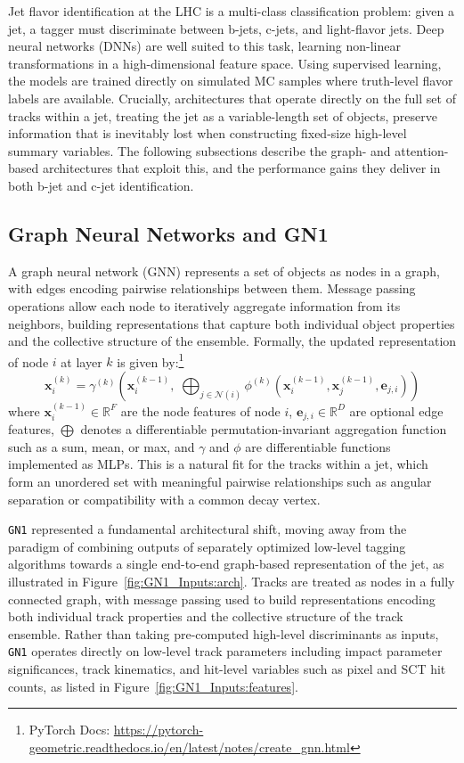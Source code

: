 Jet flavor identification at the LHC is a multi-class classification problem: given a jet, a tagger must discriminate between b-jets, c-jets, and light-flavor jets. 
Deep neural networks (DNNs) are well suited to this task, learning non-linear transformations in a high-dimensional feature space. 
Using supervised learning, the models are trained directly on simulated MC samples where truth-level flavor labels are available. 
Crucially, architectures that operate directly on the full set of tracks within a jet, treating the jet as a variable-length set of objects, preserve information that is inevitably lost when constructing fixed-size high-level summary variables. 
The following subsections describe the graph- and attention-based architectures that exploit this, and the performance gains they deliver in both b-jet and c-jet identification.

\subsection{Graph Neural Networks and GN1}

A graph neural network (GNN) represents a set of objects as nodes in a graph, with edges encoding pairwise relationships between them. 
Message passing operations allow each node to iteratively aggregate information from its neighbors, building representations that capture both individual object properties and the collective structure of the ensemble. 
Formally, the updated representation of node $i$ at layer $k$ is given by:\footnote{PyTorch Docs: \url{https://pytorch-geometric.readthedocs.io/en/latest/notes/create_gnn.html}}
\begin{equation}
	\mathbf{x}_i^{(k)} = \gamma^{(k)} \!\left( \mathbf{x}_i^{(k-1)},\; \bigoplus_{j \in \mathcal{N}(i)} \phi^{(k)}\!\left( \mathbf{x}_i^{(k-1)}, \mathbf{x}_j^{(k-1)}, \mathbf{e}_{j,i} \right) \right)
\end{equation}
where $\mathbf{x}_i^{(k-1)} \in \mathbb{R}^F$ are the node features of node $i$, $\mathbf{e}_{j,i} \in \mathbb{R}^D$ are optional edge features, $\bigoplus$ denotes a differentiable permutation-invariant aggregation function such as a sum, mean, or max, and $\gamma$ and $\phi$ are differentiable functions implemented as MLPs. 
This is a natural fit for the tracks within a jet, which form an unordered set with meaningful pairwise relationships such as angular separation or compatibility with a common decay vertex.

\texttt{GN1} represented a fundamental architectural shift, moving away from the paradigm of combining outputs of separately optimized low-level tagging algorithms towards a single end-to-end graph-based representation of the jet, as illustrated in Figure~\ref{fig:GN1_Inputs:arch}.
Tracks are treated as nodes in a fully connected graph, with message passing used to build representations encoding both individual track properties and the collective structure of the track ensemble.
Rather than taking pre-computed high-level discriminants as inputs, \texttt{GN1} operates directly on low-level track parameters including impact parameter significances, track kinematics, and hit-level variables such as pixel and SCT hit counts, as listed in Figure~\ref{fig:GN1_Inputs:features}.

